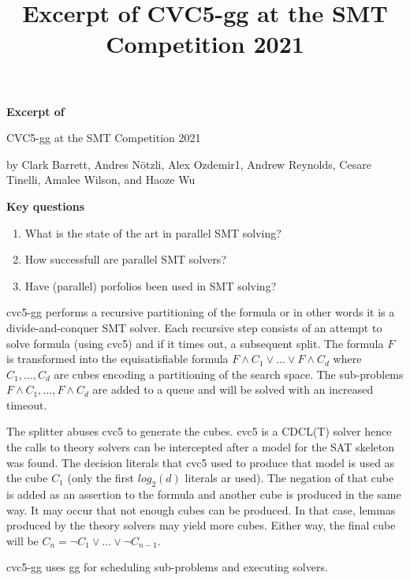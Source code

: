 \documentclass{scrartcl}
\title{Excerpt of CVC5-gg at the SMT Competition 2021}
\begin{document}
\begin{center}
    \Large{\textbf{Excerpt of}}

    \LARGE{CVC5-gg at the SMT Competition 2021}

    \large{by Clark Barrett, Andres Nötzli, Alex Ozdemir1, Andrew Reynolds,
    Cesare Tinelli, Amalee Wilson, and Haoze Wu}
\end{center}

\vspace{1cm}

\begin{addmargin}[0.2\linewidth]{0.2\linewidth}
    \begin{center}
        \textbf{Key questions}
    \end{center}
    \begin{enumerate}[i]
        \item What is the state of the art in parallel SMT solving?
        \item How successfull are parallel SMT solvers?
        \item Have (parallel) porfolios been used in SMT solving?
    \end{enumerate}
\end{addmargin}

\vspace{1cm}

cvc5-gg performs a recursive partitioning of the formula
or in other words it is a divide-and-conquer SMT solver.
Each recursive step consists of an attempt to solve formula (using cvc5)
and if it times out, a subsequent split.
The formula \(F\) is transformed into the equisatisfiable formula
\(F \wedge C_1 \vee \dots \vee F \wedge C_d\) where \(C_1, \dotsc, C_d\) are cubes
encoding a partitioning of the search space.
The sub-problems \(F \wedge C_1, \dotsc, F \wedge C_d\) are added to a queue
and will be solved with an increased timeout.

The splitter abuses cvc5 to generate the cubes.
cvc5 is a CDCL(T) solver hence the calls to theory solvers can be intercepted
after a model for the SAT skeleton was found.
The decision literals that cvc5 used to produce that model is used as the cube \(C_1\)
(only the first \(log_2(d)\) literals ar used).
The negation of that cube is added as an assertion to the formula
and another cube is produced in the same way.
It may occur that not enough cubes can be produced.
In that case, lemmas produced by the theory solvers may yield more cubes.
Either way, the final cube will be \(C_n = \neg C_1 \vee \dots \vee \neg C_{n-1}\).

cvc5-gg uses gg for scheduling sub-problems and executing solvers.
\end{document}
